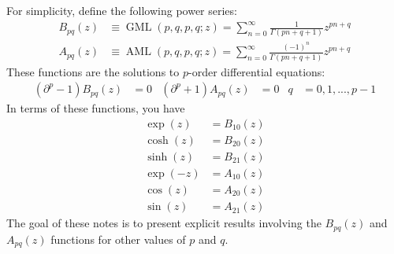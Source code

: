 For simplicity, define the following power series:
\begin{align}
    B_{pq}(z) &\equiv \operatorname{GML}(p, q, p, q; z) = \sum_{n = 0}^{\infty} \frac{1}{\Gamma(p n + q + 1)} z^{pn + q} \\
    A_{pq}(z) &\equiv \operatorname{AML}(p, q, p, q; z) = \sum_{n = 0}^{\infty} \frac{(-1)^{n}}{\Gamma(p n + q + 1)} z^{pn + q}
\end{align}
These functions are the solutions to $p$-order differential equations:
\begin{align}
    \left( \partial^{p} - 1 \right) B_{pq}(z) &= 0 & \left( \partial^{p} + 1 \right) A_{pq}(z) &= 0 & q &= 0, 1, ..., p -1
\end{align}
In terms of these functions, you have
\begin{align}
    \exp(z) &= B_{10}(z) \\
    \cosh(z) &= B_{20}(z) \\
    \sinh(z) &= B_{21}(z) \\
    \exp(-z) &= A_{10}(z) \\
    \cos(z) &= A_{20}(z) \\
    \sin(z) &= A_{21}(z)
\end{align}
The goal of these notes is to present explicit results involving the $B_{pq}(z)$ and $A_{pq}(z)$ functions for other values of $p$ and $q$.
